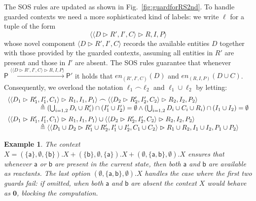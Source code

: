 \documentclass[sn-mathphys-num,a4paper,iicol,lineno,pdflatex]{sn-jnl-hacked}
\newcommand{\nil}{\mathbf{0}}
\newcommand{\obs}[2]{\langle #1\vartriangleright #2\rangle}
\theoremstyle{thmstyleone}%
\theoremstyle{thmstyletwo}%
\newtheorem{example}{Example}%
\theoremstyle{thmstylethree}%
\begin{document}
The SOS rules are updated as shown in Fig.~\ref{fig:guardforRS2nd}.
To handle guarded contexts we need a more sophisticated kind of labels: we write $\ell$ for a tuple of the form 
$$\obs{\obs{D}{R',I',C}}{R,I,P}$$
whose novel component $\obs{D}{R',I',C}$ records the available entities $D$ together with those provided by the guarded contexts, assuming all entities in $R'$ are present and those in $I'$ are absent.
The SOS rules guarantee that whenever $\mathsf{P}\xrightarrow{\obs{\obs{D}{R',I',C}}{R,I,P}} \mathsf{P}'$ it holds that 
$\mathit{en}_{(R',I',C)}(D)$ and
$\mathit{en}_{(R,I,P)}(D\cup C)$.
%
Consequently, we overload the notation $\ell_1\frown \ell_2$ and $\ell_1\cup \ell_2$ by letting:
%
{\footnotesize
\[
\begin{array}{l}
\obs{\obs{D_1}{R'_1,I'_1,C_1}}{R_1,I_1,P_1}
\frown
\obs{\obs{D_2}{R'_2,I'_2,C_2}}{R_2,I_2,P_2}
\\
\hspace{1.75cm}\triangleq (\textstyle\bigcup_{i=1,2} D_i\cup  R'_i) \cap (I'_1 \cup I'_2) = \emptyset
\wedge
(\bigcup_{i=1,2} D_i\cup  C_i\cup  R_i) \cap (I_1 \cup I_2) = \emptyset \\[5pt]
\obs{\obs{D_1}{R'_1,I'_1,C_1}}{R_1,I_1,P_1}
\cup
\obs{\obs{D_2}{R'_2,I'_2,C_2}}{R_2,I_2,P_2}
\\
\hspace{1.75cm}\triangleq \obs{\obs{D_1\cup D_2}{R'_1\cup R'_2,I'_1\cup I'_2,C_1\cup C_2}}{R_1\cup R_2,I_1\cup I_2,P_1\cup P_2}
\end{array}
\]}

\begin{example}
The context 
\(
X = (\{\mathsf{a}\},\emptyset,\{\mathsf{b}\}).X + (\{\mathsf{b}\},\emptyset,\{\mathsf{a}\}).X + (\emptyset,\{\mathsf{a},\mathsf{b}\},\emptyset).X
\)
ensures that whenever $\mathsf{a}$ or $\mathsf{b}$ are present in the current state, then both $\mathsf{a}$ and $\mathsf{b}$ are available as reactants.
The last option $(\emptyset,\{\mathsf{a},\mathsf{b}\},\emptyset).X$ handles the case where the first two guards fail: if omitted, when both $\mathsf{a}$ and $\mathsf{b}$ are absent the context $X$ would behave as $\nil$, blocking the computation.
\end{example}
\end{document}
